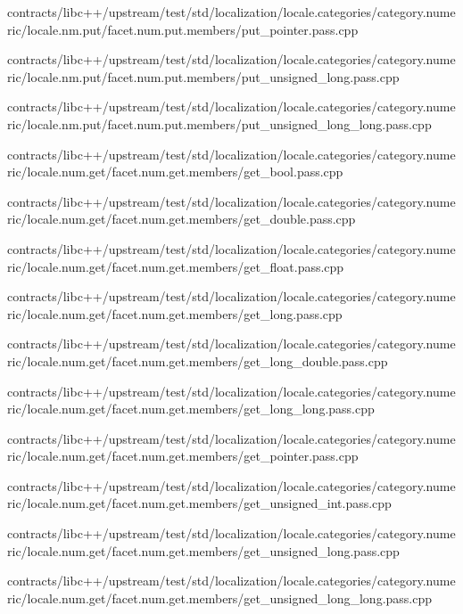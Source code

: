 \begin{DoxyCompactItemize}
contracts/libc++/upstream/test/std/localization/locale.\+categories/category.\+numeric/locale.\+nm.\+put/facet.\+num.\+put.\+members/put\+\_\+pointer.\+pass.\+cpp\item 
contracts/libc++/upstream/test/std/localization/locale.\+categories/category.\+numeric/locale.\+nm.\+put/facet.\+num.\+put.\+members/put\+\_\+unsigned\+\_\+long.\+pass.\+cpp\item 
contracts/libc++/upstream/test/std/localization/locale.\+categories/category.\+numeric/locale.\+nm.\+put/facet.\+num.\+put.\+members/put\+\_\+unsigned\+\_\+long\+\_\+long.\+pass.\+cpp\item 
contracts/libc++/upstream/test/std/localization/locale.\+categories/category.\+numeric/locale.\+num.\+get/facet.\+num.\+get.\+members/get\+\_\+bool.\+pass.\+cpp\item 
contracts/libc++/upstream/test/std/localization/locale.\+categories/category.\+numeric/locale.\+num.\+get/facet.\+num.\+get.\+members/get\+\_\+double.\+pass.\+cpp\item 
contracts/libc++/upstream/test/std/localization/locale.\+categories/category.\+numeric/locale.\+num.\+get/facet.\+num.\+get.\+members/get\+\_\+float.\+pass.\+cpp\item 
contracts/libc++/upstream/test/std/localization/locale.\+categories/category.\+numeric/locale.\+num.\+get/facet.\+num.\+get.\+members/get\+\_\+long.\+pass.\+cpp\item 
contracts/libc++/upstream/test/std/localization/locale.\+categories/category.\+numeric/locale.\+num.\+get/facet.\+num.\+get.\+members/get\+\_\+long\+\_\+double.\+pass.\+cpp\item 
contracts/libc++/upstream/test/std/localization/locale.\+categories/category.\+numeric/locale.\+num.\+get/facet.\+num.\+get.\+members/get\+\_\+long\+\_\+long.\+pass.\+cpp\item 
contracts/libc++/upstream/test/std/localization/locale.\+categories/category.\+numeric/locale.\+num.\+get/facet.\+num.\+get.\+members/get\+\_\+pointer.\+pass.\+cpp\item 
contracts/libc++/upstream/test/std/localization/locale.\+categories/category.\+numeric/locale.\+num.\+get/facet.\+num.\+get.\+members/get\+\_\+unsigned\+\_\+int.\+pass.\+cpp\item 
contracts/libc++/upstream/test/std/localization/locale.\+categories/category.\+numeric/locale.\+num.\+get/facet.\+num.\+get.\+members/get\+\_\+unsigned\+\_\+long.\+pass.\+cpp\item 
contracts/libc++/upstream/test/std/localization/locale.\+categories/category.\+numeric/locale.\+num.\+get/facet.\+num.\+get.\+members/get\+\_\+unsigned\+\_\+long\+\_\+long.\+pass.\+cpp\item 

\end{DoxyCompactItemize}
